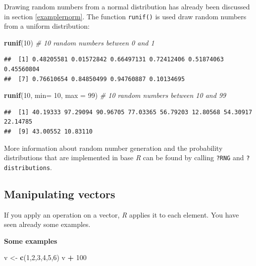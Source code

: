 \documentclass[
]{scrartcl}
\makeatletter
\newenvironment{Shaded}{\begin{snugshade}}{\end{snugshade}}
\newcommand{\CommentTok}[1]{\textcolor[rgb]{0.56,0.35,0.01}{\textit{#1}}}
\newcommand{\DataTypeTok}[1]{\textcolor[rgb]{0.13,0.29,0.53}{#1}}
\newcommand{\DecValTok}[1]{\textcolor[rgb]{0.00,0.00,0.81}{#1}}
\newcommand{\KeywordTok}[1]{\textcolor[rgb]{0.13,0.29,0.53}{\textbf{#1}}}
\newcommand{\NormalTok}[1]{#1}
\newcommand{\OperatorTok}[1]{\textcolor[rgb]{0.81,0.36,0.00}{\textbf{#1}}}
\newcommand{\StringTok}[1]{\textcolor[rgb]{0.31,0.60,0.02}{#1}}
\newenvironment{kframe}{%
\medskip{}
\setlength{\fboxsep}{.8em}
 \def\at@end@of@kframe{}%
 \ifinner\ifhmode%
  \def\at@end@of@kframe{\end{minipage}}%
  \begin{minipage}{\columnwidth}%
 \fi\fi%
 \def\FrameCommand##1{\hskip\@totalleftmargin \hskip-\fboxsep
 \colorbox{shadecolor}{##1}\hskip-\fboxsep
     \hskip-\linewidth \hskip-\@totalleftmargin \hskip\columnwidth}%
 \MakeFramed {\advance\hsize-\width
   \@totalleftmargin\z@ \linewidth\hsize
   \@setminipage}}%
 {\par\unskip\endMakeFramed%
 \at@end@of@kframe}
\newenvironment{rmdblock}[1]
  {
  \begin{itemize}
  \renewcommand{\labelitemi}{
    \raisebox{-.7\height}[0pt][0pt]{
      {\setkeys{Gin}{width=3em,keepaspectratio}\texttt{[image: images/\#1]}}
    }
  }
  \setlength{\fboxsep}{1em}
  \begin{kframe}
  \item
  }
  {
  \end{kframe}
  \end{itemize}
  }
\newenvironment{geek}
    {\begin{rmdblock}{geek}}
    {\end{rmdblock}}
\newenvironment{webexsolution}[1]
    {\par\tiny\textbf{#1}}
    {\par}
\newcommand{\webexhide}[1]{\begin{webexsolution}{#1}}
\makeatother
\begin{document}
Drawing random numbers from a normal distribution has already been discussed in section \ref{examplernorm}. The function \texttt{runif()} is used draw random numbers from a uniform distribution:

\begin{Shaded}
\begin{Highlighting}[]
\KeywordTok{runif}\NormalTok{(}\DecValTok{10}\NormalTok{)                     }\CommentTok{\# 10 random numbers between 0 and 1}
\end{Highlighting}
\end{Shaded}

\begin{verbatim}
##  [1] 0.48205581 0.01572842 0.66497131 0.72412406 0.51874063 0.45560804
##  [7] 0.76610654 0.84850499 0.94760887 0.10134695
\end{verbatim}

\begin{Shaded}
\begin{Highlighting}[]
\KeywordTok{runif}\NormalTok{(}\DecValTok{10}\NormalTok{, }\DataTypeTok{min=} \DecValTok{10}\NormalTok{, }\DataTypeTok{max =} \DecValTok{99}\NormalTok{)  }\CommentTok{\# 10 random numbers between 10 and 99}
\end{Highlighting}
\end{Shaded}

\begin{verbatim}
##  [1] 40.19333 97.29094 90.96705 77.03365 56.79203 12.80568 54.30917 22.14785
##  [9] 43.00552 10.83110
\end{verbatim}

\begin{geek}
More information about random number generation and the probability
distributions that are implemented in base \emph{R} can be found by
calling \texttt{?RNG} and \texttt{?distributions}.
\end{geek}

\hypertarget{manipulating-vectors}{%
\subsection{Manipulating vectors}\label{manipulating-vectors}}

If you apply an operation on a vector, \emph{R} applies it to each element. You have seen already some examples.

\webexhide{Some examples}

\begin{Shaded}
\begin{Highlighting}[]
\NormalTok{v \textless{}{-}}\StringTok{ }\KeywordTok{c}\NormalTok{(}\DecValTok{1}\NormalTok{,}\DecValTok{2}\NormalTok{,}\DecValTok{3}\NormalTok{,}\DecValTok{4}\NormalTok{,}\DecValTok{5}\NormalTok{,}\DecValTok{6}\NormalTok{)}
\NormalTok{v }\OperatorTok{+}\StringTok{ }\DecValTok{100}
\end{Highlighting}
\end{Shaded}
\end{document}
